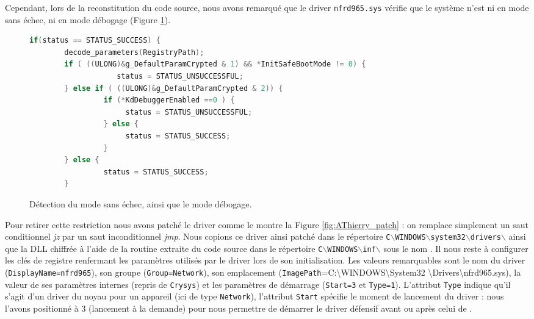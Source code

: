 Cependant, lors de la reconstitution du code source, nous avons remarqué que le driver \texttt{nfrd965.sys} vérifie que le système n'est ni en mode sans échec, ni en mode débogage (Figure \ref{fig:AThierry_AntiDebug}).

\begin{figure}
\scriptsize
\begin{changemargin}{-1cm}{-1cm}
\begin{lstlisting}[language={C}]
     if(status == STATUS_SUCCESS) {
        decode_parameters(RegistryPath);
        if ( ((ULONG)&g_DefaultParamCrypted & 1) && *InitSafeBootMode != 0) {
                    status = STATUS_UNSUCCESSFUL;
        } else if ( ((ULONG)&g_DefaultParamCrypted & 2)) {
                 if (*KdDebuggerEnabled ==0 ) {
                      status = STATUS_UNSUCCESSFUL;
                 } else {
                      status = STATUS_SUCCESS;
                 }
        } else {
                 status = STATUS_SUCCESS;
        }
\end{lstlisting}
\end{changemargin}


\caption{Détection du mode sans échec, ainsi que le mode débogage.\label{fig:AThierry_AntiDebug}}
\end{figure}


Pour retirer cette restriction nous avons patché le driver comme le montre la Figure \ref{fig:AThierry_patch} : on remplace simplement un saut conditionnel \emph{jz} par un saut inconditionnel \emph{jmp}. Nous copions ce driver ainsi patché dans le répertoire \texttt{C}$\backslash$\texttt{WINDOWS}$\backslash$\texttt{system32}$\backslash$\texttt{drivers}$\backslash$ ainsi que la DLL chiffrée à l'aide de la routine extraite du code source dans le répertoire \texttt{C}$\backslash$\texttt{WINDOWS}$\backslash$\texttt{inf}$\backslash$ sous le nom \netpDLL. Il nous reste à configurer les clés de registre renfermant les paramètres utilisés par le driver lors de son initialisation.
Les valeurs remarquables sont le nom du driver (\texttt{DisplayName=nfrd965}), son groupe (\texttt{Group=Network}), son emplacement (\texttt{ImagePath}=C:\textbackslash WINDOWS\textbackslash System32 \textbackslash Drivers\textbackslash nfrd965.sys), la valeur de ses paramètres internes (repris de \texttt{Crysys}) et les paramètres de démarrage (\texttt{Start=3} et \texttt{Type=1}).
L'attribut \texttt{Type} indique qu'il s'agit d'un driver du noyau pour un appareil (ici de type \texttt{Network}), l'attribut \texttt{Start} spécifie le moment de lancement du driver : nous l'avons positionné à 3 (lancement à la demande) pour nous permettre de démarrer le driver défensif avant ou après celui de \Duqu.


